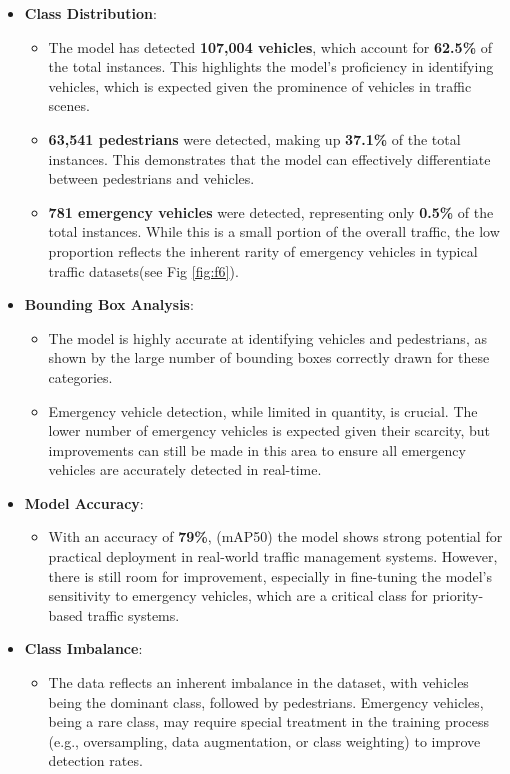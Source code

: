 \documentclass[usenatbib]{tjaa}
\begin{document}
\begin{itemize}
    \item \textbf{Class Distribution}:
    \begin{itemize}
        \item The model has detected \textbf{107,004 vehicles}, which account for \textbf{62.5\%} of the total instances. This highlights the model's proficiency in identifying vehicles, which is expected given the prominence of vehicles in traffic scenes.
        \item \textbf{63,541 pedestrians} were detected, making up \textbf{37.1\%} of the total instances. This demonstrates that the model can effectively differentiate between pedestrians and vehicles.
        \item \textbf{781 emergency vehicles} were detected, representing only \textbf{0.5\%} of the total instances. While this is a small portion of the overall traffic, the low proportion reflects the inherent rarity of emergency vehicles in typical traffic datasets(see Fig \ref{fig:f6}).
    \end{itemize}

    \item \textbf{Bounding Box Analysis}:
    \begin{itemize}
        \item The model is highly accurate at identifying vehicles and pedestrians, as shown by the large number of bounding boxes correctly drawn for these categories.
        \item Emergency vehicle detection, while limited in quantity, is crucial. The lower number of emergency vehicles is expected given their scarcity, but improvements can still be made in this area to ensure all emergency vehicles are accurately detected in real-time.
    \end{itemize}

    \item \textbf{Model Accuracy}:
    \begin{itemize}
        \item With an accuracy of \textbf{79\%}, (mAP50) the model shows strong potential for practical deployment in real-world traffic management systems. However, there is still room for improvement, especially in fine-tuning the model's sensitivity to emergency vehicles, which are a critical class for priority-based traffic systems.
    \end{itemize}

    \item \textbf{Class Imbalance}:
    \begin{itemize}
        \item The data reflects an inherent imbalance in the dataset, with vehicles being the dominant class, followed by pedestrians. Emergency vehicles, being a rare class, may require special treatment in the training process (e.g., oversampling, data augmentation, or class weighting) to improve detection rates.
    \end{itemize}


\end{itemize}
\end{document}
